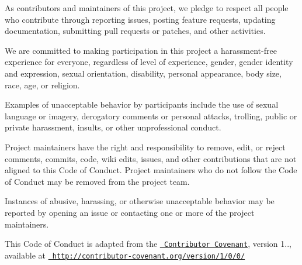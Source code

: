 As contributors and maintainers of this project, we pledge to respect all people who contribute through reporting issues, posting feature requests, updating documentation, submitting pull requests or patches, and other activities.

We are committed to making participation in this project a harassment-\/free experience for everyone, regardless of level of experience, gender, gender identity and expression, sexual orientation, disability, personal appearance, body size, race, age, or religion.

Examples of unacceptable behavior by participants include the use of sexual language or imagery, derogatory comments or personal attacks, trolling, public or private harassment, insults, or other unprofessional conduct.

Project maintainers have the right and responsibility to remove, edit, or reject comments, commits, code, wiki edits, issues, and other contributions that are not aligned to this Code of Conduct. Project maintainers who do not follow the Code of Conduct may be removed from the project team.

Instances of abusive, harassing, or otherwise unacceptable behavior may be reported by opening an issue or contacting one or more of the project maintainers.

This Code of Conduct is adapted from the \href{http://contributor-covenant.org}{\texttt{ Contributor Covenant}}, version 1.., available at \href{http://contributor-covenant.org/version/1/0/0/}{\texttt{ http\+://contributor-\/covenant.\+org/version/1/0/0/}} 
